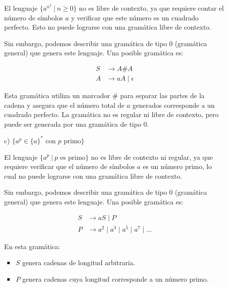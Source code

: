 \documentclass[12pt]{report} %
\begin{document}
\begin{ejercicio}
\begin{itemize}
\begin{itemize}
        \begin{solucion}

        El lenguaje $\{a^{n^2} \ | \ n \geq 0\}$ no es libre de contexto, ya que requiere contar el número de símbolos $a$ y verificar que este número es un cuadrado perfecto. Esto no puede lograrse con una gramática libre de contexto.

        Sin embargo, podemos describir una gramática de tipo 0 (gramática general) que genera este lenguaje. Una posible gramática es:

        \begin{align*}
        S &\to A \# A \\
        A &\to aA \mid \epsilon
        \end{align*}

        Esta gramática utiliza un marcador $\#$ para separar las partes de la cadena y asegura que el número total de $a$ generados corresponde a un cuadrado perfecto. La gramática no es regular ni libre de contexto, pero puede ser generada por una gramática de tipo 0.

        \end{solucion}



        \item[c)] $\{a^p \in \{a\}^* \text{ con } p \text{ primo}\}$

        \begin{solucion}

        El lenguaje $\{a^p \ | \ p \text{ es primo}\}$ no es libre de contexto ni regular, ya que requiere verificar que el número de símbolos $a$ es un número primo, lo cual no puede lograrse con una gramática libre de contexto.

        Sin embargo, podemos describir una gramática de tipo 0 (gramática general) que genera este lenguaje. Una posible gramática es:

        \begin{align*}
        S &\to aS \mid P \\
        P &\to a^2 \mid a^3 \mid a^5 \mid a^7 \mid \dots
        \end{align*}

        En esta gramática:
        \begin{itemize}
            \item $S$ genera cadenas de longitud arbitraria.
            \item $P$ genera cadenas cuya longitud corresponde a un número primo.
        \end{itemize}


\end{solucion}
\end{itemize}
\end{itemize}
\end{ejercicio}
\end{document}
